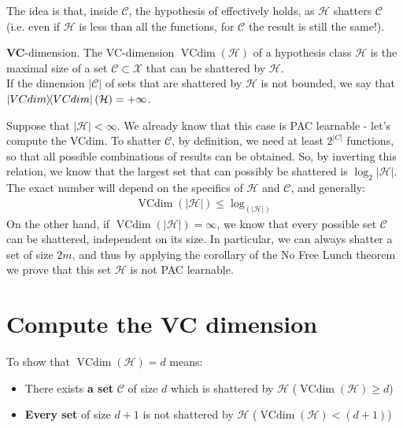 \documentclass[../template.tex]{subfiles}
\begin{document}
The idea is that, inside $\mathcal{C}$, the hypothesis of  effectively holds, as $\mathcal{H}$ shatters $\mathcal{C}$ (i.e. even if $\mathcal{H}$ is less than all the functions, for $\mathcal{C}$ the result is still the same!).

\begin{dfn}
    \textbf{VC}-dimension. The VC-dimension $\operatorname{VCdim}(\mathcal{H})$ of a hypothesis class $\mathcal{H}$ is the maximal size of a set $\mathcal{C}\subset \mathcal{X}$ that can be shattered by $\mathcal{H}$.\\
    If the dimension $|\mathcal{C}|$ of sets that are shattered by $\mathcal{H}$ is not bounded, we say that $\op{VCdim}(\mathcal{H}) = + \infty$. 
\end{dfn}

Suppose that $|\mathcal{H}| < \infty$. We already know that this case is PAC learnable - let's compute the VCdim. To shatter $\mathcal{C}$, by definition, we need at least $2^{|C|}$ functions, so that all possible combinations of results can be obtained. So, by inverting this relation, we know that the largest set that can possibly be shattered is $\log_2 |\mathcal{H}|$. The exact number will depend on the specifics of $\mathcal{H}$ and $\mathcal{C}$, and generally:
\begin{align*}
    \operatorname{VCdim}(|\mathcal{H}|) \leq \log_(|\mathcal{H}|) 
\end{align*} 
On the other hand, if $\operatorname{VCdim}(|\mathcal{H}|) = \infty$, we know that every possible set $\mathcal{C}$ can be shattered, independent on its size. In particular, we can always shatter a set of size $2m$, and thus by applying the corollary of the No Free Lunch theorem we prove that this set $\mathcal{H}$ is not PAC learnable.

\section{Compute the VC dimension}
To show that $\operatorname{VCdim}(\mathcal{H}) = d$ means:
\begin{itemize}
    \item There exists \textbf{a set} $\mathcal{C}$ of size $d$ which is shattered by $\mathcal{H}$ ($\operatorname{VCdim}(\mathcal{H}) \geq d$)
    \item \textbf{Every set} of size $d+1$ is not shattered by $\mathcal{H}$ ($\operatorname{VCdim}(\mathcal{H}) < (d+1)$)    
\end{itemize}
 
\end{document}
